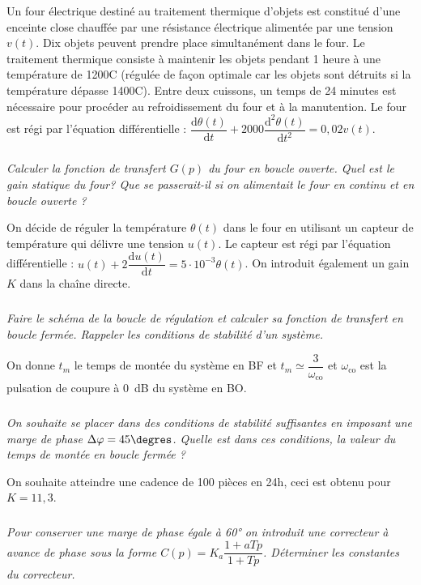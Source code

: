 \documentclass[10pt,fleqn]{article} %
\begin{document}

\vspace{5cm}
\pagestyle{fancy}
\thispagestyle{plain}

\def\columnseprulecolor{\color{ocre}}
\setlength{\columnseprule}{0.4pt} 

\def\pathfig{images}

\begin{multicols}{2}
Un four électrique destiné au traitement thermique d'objets est constitué d'une enceinte close chauffée par une résistance électrique alimentée par une tension $ v(t)$. Dix objets peuvent prendre place simultanément dans le four. Le traitement thermique consiste à maintenir les objets pendant 1 heure à une température de 1200\degres C (régulée de façon optimale car les objets sont détruits si la température dépasse  1400\degres C).
Entre deux cuissons, un temps de 24 minutes est nécessaire pour procéder au refroidissement du four et à la manutention.
Le four est régi par l’équation différentielle : $\dfrac{\text{d}\theta(t)}{\text{d}t}+2000\dfrac{\text{d}^2\theta(t)}{\text{d}t^2}=0,02 v(t)$.


\subparagraph{}\textit{Calculer la fonction de transfert $G(p)$ du four en boucle ouverte. Quel est le gain statique du four? Que se passerait-il si on alimentait le four en continu et en boucle ouverte ?}

On décide de réguler la température $\theta(t)$ dans le four en utilisant un capteur de température qui délivre une tension $u(t)$. Le capteur est régi par l’équation différentielle :  $u(t)+2\dfrac{\text{d}u(t)}{\text{d}t}=5\cdot 10^{-3} \theta(t)$. On introduit également un gain $K$ dans la chaîne directe.

\subparagraph{}\textit{Faire le schéma de la boucle de régulation et calculer sa fonction de transfert en boucle fermée. Rappeler  les conditions de stabilité d'un système.}


\vspace{.25cm}

On donne $t_m$ le temps de montée du système en BF et $t_m\simeq \dfrac{3}{\omega_{\text{co}}}$ et $\omega_{\text{co}}$ est la pulsation de coupure à \SI{0}{dB} du système en BO.  

\vspace{.25cm}

\subparagraph{}\textit{On souhaite se placer dans des conditions de stabilité suffisantes en imposant une marge de phase $\Delta \varphi= 45\degres$. Quelle  est dans ces conditions, la valeur du temps de montée en boucle fermée  ?}

\vspace{.25cm}
On souhaite atteindre une cadence de 100 pièces en 24h, ceci est obtenu pour $K=11,3$.

\subparagraph{}
\textit{Pour conserver une marge de phase égale à 60° on introduit une correcteur à avance de phase sous la forme $C(p)=K_a \dfrac{1+aTp}{1+Tp}$. Déterminer les constantes du correcteur.}



\end{multicols}
\end{document}
